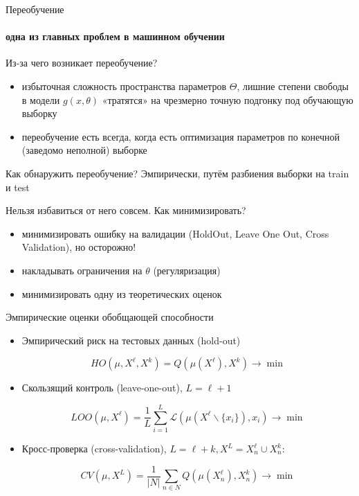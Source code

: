 \documentclass[fullscreen=true, bookmarks=true, hyperref={pdfencoding=unicode}]{beamer}
\begin{document}
\begin{frame}{Переобучение}
  \framesubtitle{одна из главных проблем в машинном обучении}

  \begin{block}{Из-за чего возникает переобучение?}
    \begin{itemize}
      \item избыточная сложность пространства параметров $\Theta$, лишние степени свободы в модели $g(x, \theta)$ «тратятся» на чрезмерно точную подгонку под обучающую выборку
      \item переобучение есть всегда, когда есть оптимизация параметров по конечной (заведомо неполной) выборке
    \end{itemize}
  \end{block}

  \begin{block}{Как обнаружить переобучение?}
    Эмпирически, путём разбиения выборки на train и test
  \end{block}

  \begin{block}{Нельзя избавиться от него совсем. Как минимизировать?}
    \begin{itemize}
      \item минимизировать ошибку на валидации (HoldOut, Leave One Out, Cross Validation), но осторожно!
      \item накладывать ограничения на $\theta$ (регуляризация)
      \item минимизировать одну из теоретических оценок
    \end{itemize}
  \end{block}
\end{frame}


\begin{frame}{Эмпирические оценки обобщающей способности}
  \begin{itemize}
    \item Эмпирический риск на тестовых данных (hold-out)

      $$HO(\mu, X^\ell, X^k) = Q(\mu(X^\ell), X^k) \to \min$$

    \item Скользящий контроль (leave-one-out), $L = \ell + 1$

      $$LOO(\mu, X^\ell) = \frac1L \sum\limits_{i=1}^L \mathcal{L}(\mu(X^\ell\backslash \{x_i\}), x_i) \to \min$$

    \item Кросс-проверка (cross-validation), $L = \ell + k, X^L = X^\ell_n \cup X^k_n$:

      $$CV(\mu, X^L) = \frac1{|N|} \sum\limits_{n \in N} {Q}(\mu(X^\ell_n), X^k_n) \to \min$$
  \end{itemize}
\end{frame}
\end{document}
